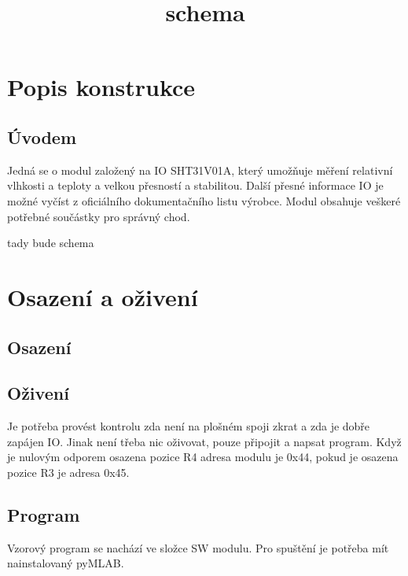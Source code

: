\documentclass[12pt,a4paper]{article}
\begin{document}

\flushbottom
\newpage

\section{Popis konstrukce}\label{popis-konstrukce}

\subsection{Úvodem}\label{uxfavodem}

Jedná se o modul založený na IO SHT31V01A, který umožňuje měření
relativní vlhkosti a teploty a velkou přesností a stabilitou. Další
přesné informace IO je možné vyčíst z oficiálního dokumentačního listu
výrobce. Modul obsahuje veškeré potřebné součástky pro správný chod.

\newpage

\title{schema}

tady bude schema

\newpage

\section{Osazení a oživení}\label{osazenuxed-a-oux17eivenuxed}

\subsection{Osazení}\label{osazenuxed}

\subsection{Oživení}\label{oux17eivenuxed}

Je potřeba provést kontrolu zda není na plošném spoji zkrat a zda je
dobře zapájen IO. Jinak není třeba nic oživovat, pouze připojit a napsat
program. Když je nulovým odporem osazena pozice R4 adresa modulu je
0x44, pokud je osazena pozice R3 je adresa 0x45.

\subsection{Program}\label{program}

Vzorový program se nachází ve složce SW modulu. Pro spuštění je potřeba
mít nainstalovaný pyMLAB.
\end{document}
